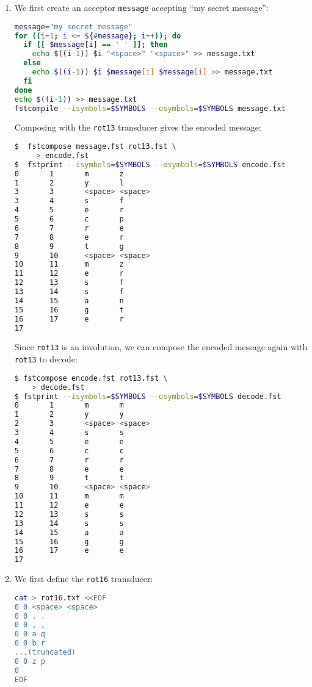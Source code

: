 \documentclass[a4paper,oneside,reqno]{amsart}
\begin{document}
\begin{enumerate}[label=\arabic*.]
\begin{enumerate}[label=(\alph*)]
      \item We first create an acceptor \texttt{message} accepting ``my secret message'':
        \begin{lstlisting}[language=bash]
message="my secret message"
for ((i=1; i <= ${#message}; i++)); do
  if [[ $message[i] == ' ' ]]; then
    echo $((i-1)) $i "<space>" "<space>" >> message.txt
  else
    echo $((i-1)) $i $message[i] $message[i] >> message.txt
  fi
done
echo $((i-1)) >> message.txt
fstcompile --isymbols=$SYMBOLS --osymbols=$SYMBOLS message.txt
    \end{lstlisting}

    Composing with the \texttt{rot13} transducer gives the encoded message:
    \begin{lstlisting}[language=bash]
$  fstcompose message.fst rot13.fst \
     > encode.fst
$  fstprint --isymbols=$SYMBOLS --osymbols=$SYMBOLS encode.fst
0       1       m       z
1       2       y       l
3       3       <space> <space>
3       4       s       f
4       5       e       r
5       6       c       p
6       7       r       e
7       8       e       r
8       9       t       g
9       10      <space> <space>
10      11      m       z
11      12      e       r
12      13      s       f
13      14      s       f
14      15      a       n
15      16      g       t
16      17      e       r
17
    \end{lstlisting}

    Since \texttt{rot13} is an involution, we can compose the encoded
    message again with \texttt{rot13} to decode:
    \begin{lstlisting}[language=bash]
$ fstcompose encode.fst rot13.fst \
    > decode.fst
$ fstprint --isymbols=$SYMBOLS --osymbols=$SYMBOLS decode.fst
0       1       m       m
1       2       y       y
2       3       <space> <space>
3       4       s       s
4       5       e       e
5       6       c       c
6       7       r       r
7       8       e       e
8       9       t       t
9       10      <space> <space>
10      11      m       m
11      12      e       e
12      13      s       s
13      14      s       s
14      15      a       a
15      16      g       g
16      17      e       e
17
    \end{lstlisting}

  \item We first define the \texttt{rot16} transducer:
    \begin{lstlisting}[language=bash]
cat > rot16.txt <<EOF
0 0 <space> <space>
0 0 . .
0 0 , ,
0 0 a q
0 0 b r
...(truncated)
0 0 z p
0
EOF
    \end{lstlisting}


\end{enumerate}
\end{enumerate}
\end{document}
